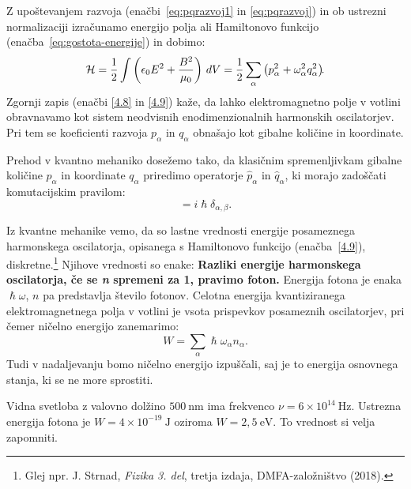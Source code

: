 Z upoštevanjem razvoja (enačbi~\ref{eq:pqrazvoj1} in \ref{eq:pqrazvoj}) in ob ustrezni
normalizaciji izračunamo energijo 
polja ali Hamiltonovo 
funkcijo (enačba~\ref{eq:gostota-energije}) in dobimo:
\begin{equation}
{\cal H}=\frac{1}{2}\int\left(\epsilon_{0}E^{2}+\frac{B^{2}}{\mu_0}\right)\, 
dV=\frac{1}{2}\sum_{\alpha}\left(p_{\alpha}^{2}+\omega_{\alpha}^{2}q_{\alpha}^{2}\right)\!\!.
\label{4.9}
\end{equation}
Zgornji zapis (enačbi \ref{4.8} in \ref{4.9}) kaže, 
da lahko elektromagnetno polje v votlini
obravnavamo kot sistem neodvisnih enodimenzionalnih harmonskih oscilatorjev. 
Pri tem se koeficienti razvoja $p_{\alpha}$ in $q_{\alpha}$ obnašajo kot
gibalne količine in koordinate.

Prehod v kvantno mehaniko dosežemo tako, da klasičnim spremenljivkam gibalne količine $p_{\alpha}$
in koordinate $q_{\alpha}$ priredimo operatorje $\hat{p}_{\alpha}$ in $\hat{q}_{\alpha}$,
ki morajo zadoščati komutacijskim pravilom:
\begin{equation}
[\hat{q}_{\alpha},\hat{p}_{\beta}]=i\hslash \delta_{\alpha, \beta}.
\label{4.10}
\end{equation}

Iz kvantne mehanike vemo, da so lastne vrednosti energije posameznega harmonskega oscilatorja, 
opisanega s Hamiltonovo funkcijo (enačba~\ref{4.9}), diskretne.\footnote{Glej npr. J. Strnad, 
{\it Fizika 3. del}, tretja izdaja, DMFA-založništvo (2018).} Njihove vrednosti so 
enake:
{\bf Razliki energije harmonskega oscilatorja, če se \textit{\textbf{n}}
spremeni za 1, pravimo foton.} Energija
fotona je enaka $\hslash \omega$, $n$ pa predstavlja število fotonov. Celotna
energija kvantiziranega elektro\-magnetnega polja v votlini je vsota prispevkov
posameznih oscilatorjev, pri čemer ničelno energijo zanemarimo:
\begin{equation}
W = \sum_\alpha \hslash \omega_\alpha n_\alpha.
\end{equation}
Tudi v nadaljevanju bomo ničelno energijo izpuščali, 
saj je to energija osnovnega stanja, ki se ne more sprostiti. 

\begin{remark}
Vidna svetloba z valovno dolžino $500~\si{\nano\metre}$ ima frekvenco
$\nu = 6 \times 10^{14}~\si{\hertz}$. Ustrezna energija fotona je
$W = 4 \times 10^{-19}~\si{\joule}$ oziroma $W = 2,5~\mathrm{e}\si{\volt}$.
To vrednost si velja zapomniti.
\end{remark}

